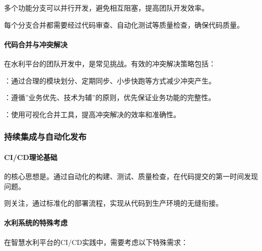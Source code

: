多个功能分支可以并行开发，避免相互阻塞，提高团队开发效率。


每个分支合并都需要经过代码审查、自动化测试等质量检查，确保代码质量。

\hypertarget{ux4ee3ux7801ux5408ux5e76ux4e0eux51b2ux7a81ux89e3ux51b3}{%
\paragraph{代码合并与冲突解决}\label{ux4ee3ux7801ux5408ux5e76ux4e0eux51b2ux7a81ux89e3ux51b3}}

在水利平台的团队开发中，是常见挑战。有效的冲突解决策略包括：

：通过合理的模块划分、定期同步、小步快跑等方式减少冲突产生。

：遵循''业务优先、技术为辅''的原则，优先保证业务功能的完整性。

：使用可视化合并工具，提高冲突解决的效率和准确性。

\hypertarget{ux6301ux7eedux96c6ux6210ux4e0eux81eaux52a8ux5316ux53d1ux5e03}{%
\subsubsection{持续集成与自动化发布}\label{ux6301ux7eedux96c6ux6210ux4e0eux81eaux52a8ux5316ux53d1ux5e03}}

\hypertarget{cicdux7406ux8bbaux57faux7840}{%
\paragraph{CI/CD理论基础}\label{cicdux7406ux8bbaux57faux7840}}

的核心思想是。通过自动化的构建、测试、质量检查，在代码提交的第一时间发现问题。

则关注，通过标准化的部署流程，实现从代码到生产环境的无缝衔接。

\hypertarget{ux6c34ux5229ux7cfbux7edfux7684ux7279ux6b8aux8003ux8651}{%
\paragraph{水利系统的特殊考虑}\label{ux6c34ux5229ux7cfbux7edfux7684ux7279ux6b8aux8003ux8651}}

在智慧水利平台的CI/CD实践中，需要考虑以下特殊需求：

